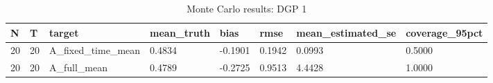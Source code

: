 \begin{table}[!htbp]
\centering
\caption{Monte Carlo results: DGP 1}
\label{tab:mc-dgp1}
\begin{tabular}{llllllll}
\toprule
N & T & target & mean\_truth & bias & rmse & mean\_estimated\_se & coverage\_95pct \\
\midrule
20 & 20 & A\_fixed\_time\_mean & 0.4834 & -0.1901 & 0.1942 & 0.0993 & 0.5000 \\
20 & 20 & A\_full\_mean & 0.4789 & -0.2725 & 0.9513 & 4.4428 & 1.0000 \\
\bottomrule
\end{tabular}
\end{table}
